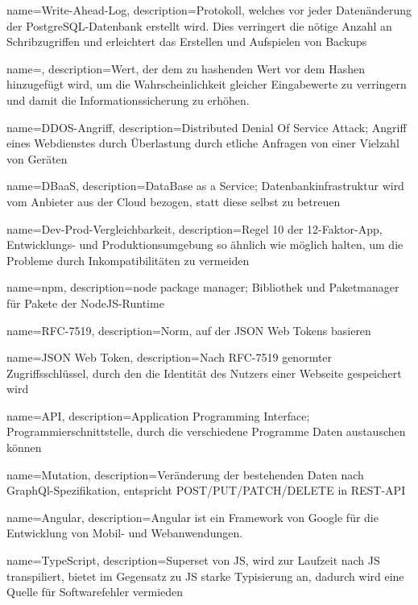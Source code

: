 {
    name=Write-Ahead-Log,
    description={Protokoll, welches vor jeder Datenänderung der PostgreSQL-Datenbank erstellt wird. Dies verringert die nötige Anzahl an Schribzugriffen und erleichtert das Erstellen und Aufspielen von Backups}
}

{
    name=,
    description={Wert, der dem zu hashenden Wert vor dem Hashen hinzugefügt wird, um die Wahrscheinlichkeit gleicher Eingabewerte zu verringern und damit die Informationssicherung zu erhöhen.}
}

{
    name=DDOS-Angriff,
    description={Distributed Denial Of Service Attack; Angriff eines Webdienstes durch Überlastung durch etliche Anfragen von einer Vielzahl von Geräten}
}

{
    name=DBaaS,
    description={DataBase as a Service; Datenbankinfrastruktur wird vom Anbieter aus der Cloud bezogen, statt diese selbst zu betreuen}
}

{
    name=Dev-Prod-Vergleichbarkeit,
    description={Regel 10 der 12-Faktor-App, Entwicklungs- und Produktionsumgebung so ähnlich wie möglich halten, um die Probleme durch Inkompatibilitäten zu vermeiden}
}

{
    name=npm,
    description={node package manager; Bibliothek und Paketmanager für Pakete der NodeJS-Runtime}
}

{
    name=RFC-7519,
    description={Norm, auf der JSON Web Tokens basieren}
}

{
    name=JSON Web Token,
    description={Nach RFC-7519 genormter Zugriffsschlüssel, durch den die Identität des Nutzers einer Webseite gespeichert wird}
}

{
    name=API,
    description={Application Programming Interface; Programmierschnittstelle, durch die verschiedene Programme Daten austauschen können}
}

{
    name=Mutation,
    description={Veränderung der bestehenden Daten nach GraphQl-Spezifikation, entspricht POST/PUT/PATCH/DELETE in REST-API}
}

{
    name=Angular,
    description={Angular ist ein Framework von Google für die Entwicklung von Mobil- und Webanwendungen. } 
}

{
    name=TypeScript,
    description={Superset von JS, wird zur Laufzeit nach JS transpiliert, bietet im Gegensatz zu JS starke Typisierung an, dadurch wird eine Quelle für Softwarefehler vermieden}
}

